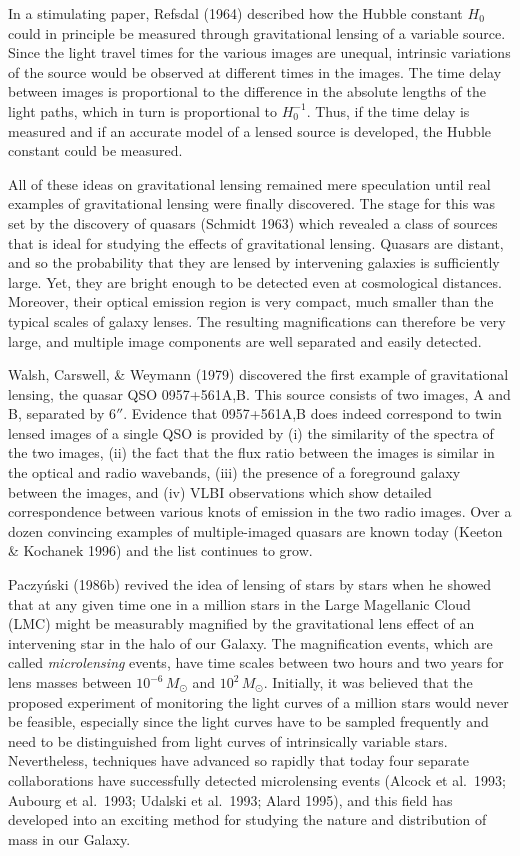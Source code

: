 \documentclass[a4paper,10pt]{article} %
\begin{document}
In a stimulating paper, Refsdal (1964) described how the Hubble
constant $H_0$ could in principle be measured through gravitational
lensing of a variable source. Since the light travel times for the
various images are unequal, intrinsic variations of the source would
be observed at different times in the images. The time delay between
images is proportional to the difference in the absolute lengths of
the light paths, which in turn is proportional to $H_0^{-1}$. Thus, if
the time delay is measured and if an accurate model of a lensed source
is developed, the Hubble constant could be measured.

All of these ideas on gravitational lensing remained mere speculation
until real examples of gravitational lensing were finally discovered.
The stage for this was set by the discovery of quasars (Schmidt 1963)
which revealed a class of sources that is ideal for studying the
effects of gravitational lensing. Quasars are distant, and so the
probability that they are lensed by intervening galaxies is
sufficiently large. Yet, they are bright enough to be detected even at
cosmological distances. Moreover, their optical emission region is
very compact, much smaller than the typical scales of galaxy
lenses. The resulting magnifications can therefore be very large, and
multiple image components are well separated and easily detected.

Walsh, Carswell, \& Weymann (1979) discovered the first example of
gravitational lensing, the quasar QSO 0957+561A,B. This source
consists of two images, A and B, separated by $6''$. Evidence that
0957+561A,B does indeed correspond to twin lensed images of a single
QSO is provided by (i) the similarity of the spectra of the two
images, (ii) the fact that the flux ratio between the images is
similar in the optical and radio wavebands, (iii) the presence of a
foreground galaxy between the images, and (iv) VLBI observations which
show detailed correspondence between various knots of emission in the
two radio images. Over a dozen convincing examples of multiple-imaged
quasars are known today (Keeton \& Kochanek 1996) and the list
continues to grow.

Paczy\'nski (1986b) revived the idea of lensing of stars by stars when
he showed that at any given time one in a million stars in the Large
Magellanic Cloud (LMC) might be measurably magnified by the
gravitational lens effect of an intervening star in the halo of our
Galaxy. The magnification events, which are called {\em
microlensing\/} events, have time scales between two hours and two
years for lens masses between $10^{-6}\,M_\odot$ and
$10^2\,M_\odot$. Initially, it was believed that the proposed
experiment of monitoring the light curves of a million stars would
never be feasible, especially since the light curves have to be
sampled frequently and need to be distinguished from light curves of
intrinsically variable stars.  Nevertheless, techniques have advanced
so rapidly that today four separate collaborations have successfully
detected microlensing events (Alcock et al.\ 1993; Aubourg et al.\
1993; Udalski et al.\ 1993; Alard 1995), and this field has developed
into an exciting method for studying the nature and distribution of
mass in our Galaxy.
\end{document}
